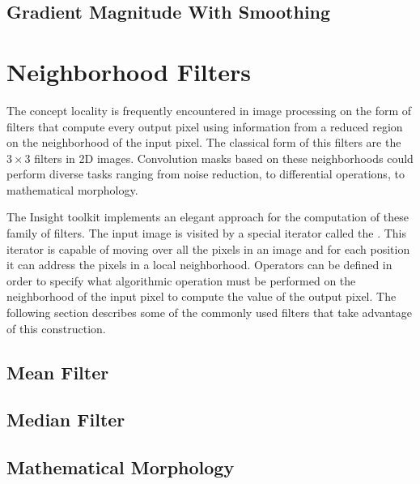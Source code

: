 

\subsection{Gradient Magnitude With Smoothing}
\label{sec:GradientMagnitudeRecursiveGaussianImageFilter}






\section{Neighborhood Filters}
\label{sec:NeighborhoodFilters}

The concept locality is frequently encountered in image processing on the form
of filters that compute every output pixel using information from a reduced
region on the neighborhood of the input pixel. The classical form of this
filters are the $3 \times 3$ filters in 2D images. Convolution masks based on
these neighborhoods could perform diverse tasks ranging from noise reduction,
to differential operations, to mathematical morphology.

The Insight toolkit implements an elegant approach for the computation of these
family of filters. The input image is visited by a special iterator called the
. This iterator is capable of moving over all
the pixels in an image and for each position it can address the pixels in a
local neighborhood. Operators can be defined in order to specify what
algorithmic operation must be performed on the neighborhood of the input pixel
to compute the value of the output pixel. The following section describes some
of the commonly used filters that take advantage of this construction.  

\subsection{Mean Filter}
\label{sec:MeanFilter}



\subsection{Median Filter}
\label{sec:MedianFilter}




\subsection{Mathematical Morphology}
\label{sec:MathematicalMorphology}

